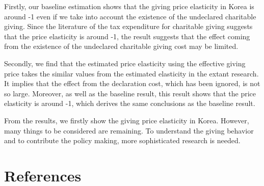 \documentclass[
  11pt,
  a4paper,
]{article}
\begin{document}
Firstly, our baseline estimation shows that the giving price elasticity in Korea is around -1 even if we take into account the existence of the undeclared charitable giving. Since the literature of the tax expenditure for charitable giving suggests that the price elasticity is around -1, the result suggests that the effect coming from the existence of the undeclared charitable giving cost may be limited.

Secondly, we find that the estimated price elasticity using the effective giving price takes the similar values from the estimated elasticity in the extant research. It implies that the effect from the declaration cost, which has been ignored, is not so large. Moreover, as well as the baseline result, this result shows that the price elasticity is around -1, which derives the same conclusions as the baseline result.

From the results, we firstly show the giving price elasticity in Korea. However, many things to be considered are remaining. To understand the giving behavior and to contribute the policy making, more sophisticated research is needed.

\clearpage

\hypertarget{references}{%
\section*{References}\label{references}}
\end{document}
